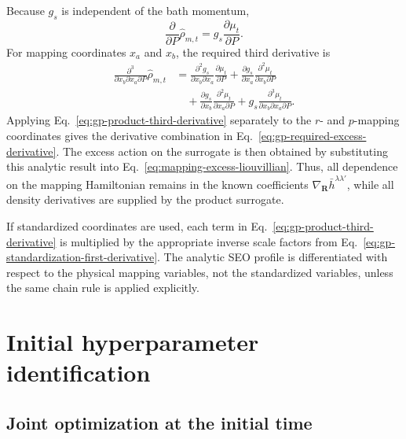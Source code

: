 \documentclass[
  11pt,
  letterpaper,
  onehalfspacing,
  normalmargins,
  equalmargins,
  oneside
]{ut-thesis}
\begin{document}
Because \(g_s\) is independent of the bath momentum,
\begin{equation}
\frac{\partial}{\partial P}
\widehat{\rho}_{m,t}
=
 g_s
\frac{\partial\mu_t}{\partial P}.
\label{eq:gp-product-P-derivative}
\end{equation}
For mapping coordinates \(x_a\) and \(x_b\), the required third derivative
is
\begin{align}
\frac{\partial^3}{\partial x_b\partial x_a\partial P}
\widehat{\rho}_{m,t}
&=
\frac{\partial^2g_s}{\partial x_b\partial x_a}
\frac{\partial\mu_t}{\partial P}
+
\frac{\partial g_s}{\partial x_a}
\frac{\partial^2\mu_t}{\partial x_b\partial P}
\nonumber\\
&\quad
+
\frac{\partial g_s}{\partial x_b}
\frac{\partial^2\mu_t}{\partial x_a\partial P}
+
 g_s
\frac{\partial^3\mu_t}
{\partial x_b\partial x_a\partial P}.
\label{eq:gp-product-third-derivative}
\end{align}
Applying Eq.~\eqref{eq:gp-product-third-derivative} separately to the
\(r\)- and \(p\)-mapping coordinates gives the derivative combination in
Eq.~\eqref{eq:gp-required-excess-derivative}. The excess action on the
surrogate is then obtained by substituting this analytic result into
Eq.~\eqref{eq:mapping-excess-liouvillian}. Thus, all dependence on the
mapping Hamiltonian remains in the known coefficients
\(\nabla_{\mathbf R}\bar h^{\lambda\lambda'}\), while all density
derivatives are supplied by the product surrogate.

If standardized coordinates are used, each term in
Eq.~\eqref{eq:gp-product-third-derivative} is multiplied by the appropriate
inverse scale factors from
Eq.~\eqref{eq:gp-standardization-first-derivative}. The analytic SEO profile
is differentiated with respect to the physical mapping variables, not the
standardized variables, unless the same chain rule is applied explicitly.


\section{Initial hyperparameter identification}
\label{sec:initial-hyperparameter-identification}

\subsection{Joint optimization at the initial time}
\label{subsec:initial-joint-hyperparameter-fit}
\end{document}
